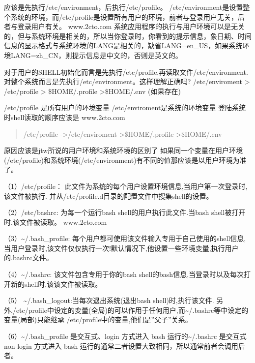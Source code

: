 \documentclass[a4paper,10pt,english]{sphinxmanual}
\begin{document}
应该是先执行/etc/environment，后执行/etc/profile。
/etc/environment是设置整个系统的环境，而/etc/profile是设置所有用户的环境，前者与登录用户无关，后者与登录用户有关。  www.2cto.com
系统应用程序的执行与用户环境可以是无关的，但与系统环境是相关的，所以当你登录时，你看到的提示信息，象日期、时间信息的显示格式与系统环境的LANG是相关的，缺省LANG=en\_US，如果系统环境LANG=zh\_CN，则提示信息是中文的，否则是英文的。

对于用户的SHELL初始化而言是先执行/etc/profile,再读取文件/etc/environment.对整个系统而言是先执行/etc/environment。这样理解正确吗?
/etc/enviroment \textendash{}\textgreater{} /etc/profile \textendash{}\textgreater{} \$HOME/.profile   \textendash{}\textgreater{}\$HOME/.env (如果存在)

/etc/profile 是所有用户的环境变量
/etc/enviroment是系统的环境变量
登陆系统时shell读取的顺序应该是   www.2cto.com
\begin{quote}

/etc/profile -\textgreater{}/etc/enviroment \textendash{}\textgreater{}\$HOME/.profile   \textendash{}\textgreater{}\$HOME/.env
\end{quote}

原因应该是jtw所说的用户环境和系统环境的区别了
如果同一个变量在用户环境(/etc/profile)和系统环境(/etc/environment)有不同的值那应该是以用户环境为准了。

（1）/etc/profile： 此文件为系统的每个用户设置环境信息,当用户第一次登录时,该文件被执行. 并从/etc/profile.d目录的配置文件中搜集shell的设置。

（2）/etc/bashrc: 为每一个运行bash shell的用户执行此文件.当bash shell被打开时,该文件被读取。  www.2cto.com

（3）\textasciitilde{}/.bash\_profile: 每个用户都可使用该文件输入专用于自己使用的shell信息,当用户登录时,该文件仅仅执行一次!默认情况下,他设置一些环境变量,执行用户的.bashrc文件。

（4）\textasciitilde{}/.bashrc: 该文件包含专用于你的bash shell的bash信息,当登录时以及每次打开新的shell时,该该文件被读取。

（5） \textasciitilde{}/.bash\_logout:当每次退出系统(退出bash shell)时,执行该文件. 另外,/etc/profile中设定的变量(全局)的可以作用于任何用户,而\textasciitilde{}/.bashrc等中设定的变量(局部)只能继承 /etc/profile中的变量,他们是”父子”关系。

（6）\textasciitilde{}/.bash\_profile 是交互式、login 方式进入 bash 运行的\textasciitilde{}/.bashrc 是交互式 non-login 方式进入 bash 运行的通常二者设置大致相同，所以通常前者会调用后者。
\end{document}
